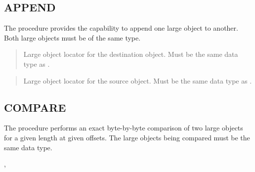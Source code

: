 \documentclass[letterpaper,10pt,english,openany,oneside]{sphinxmanual}
\begin{document}
\newpage


\subsection{APPEND}
\label{\detokenize{append::doc}}\label{\detokenize{append:append}}
The  procedure provides the capability to append one large object
to another. Both large objects must be of the same type.



\begin{quote}

Large object locator for the destination object. Must be the same data
type as .
\end{quote}

\begin{quote}

Large object locator for the source object. Must be the same data type
as .
\end{quote}

\newpage


\subsection{COMPARE}
\label{\detokenize{compare::doc}}\label{\detokenize{compare:compare}}
The  procedure performs an exact byte-by-byte comparison of two
large objects for a given length at given offsets. The large objects
being compared must be the same data type.

,
\begin{quote}


\end{quote}
\end{document}
